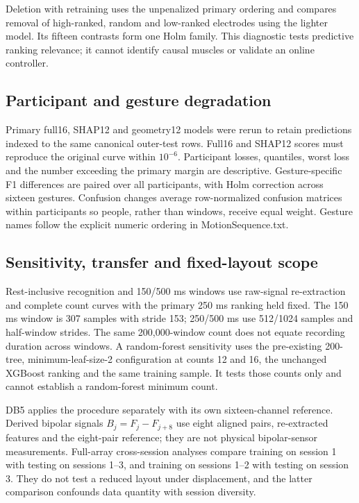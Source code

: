 Deletion with retraining uses the unpenalized primary ordering and compares removal of high-ranked, random and low-ranked electrodes using the lighter model. Its fifteen contrasts form one Holm family. This diagnostic tests predictive ranking relevance; it cannot identify causal muscles or validate an online controller.

\subsection{Participant and gesture degradation}
Primary full16, SHAP12 and geometry12 models were rerun to retain predictions indexed to the same canonical outer-test rows. Full16 and SHAP12 scores must reproduce the original curve within $10^{-6}$. Participant losses, quantiles, worst loss and the number exceeding the primary margin are descriptive. Gesture-specific F1 differences are paired over all participants, with Holm correction across sixteen gestures. Confusion changes average row-normalized confusion matrices within participants so people, rather than windows, receive equal weight. Gesture names follow the explicit numeric ordering in MotionSequence.txt.

\subsection{Sensitivity, transfer and fixed-layout scope}
Rest-inclusive recognition and 150/500 ms windows use raw-signal re-extraction and complete count curves with the primary 250 ms ranking held fixed. The 150 ms window is 307 samples with stride 153; 250/500 ms use 512/1024 samples and half-window strides. The same 200,000-window count does not equate recording duration across windows. A random-forest sensitivity uses the pre-existing 200-tree, minimum-leaf-size-2 configuration at counts 12 and 16, the unchanged XGBoost ranking and the same training sample. It tests those counts only and cannot establish a random-forest minimum count.

DB5 applies the procedure separately with its own sixteen-channel reference. Derived bipolar signals $B_j=F_j-F_{j+8}$ use eight aligned pairs, re-extracted features and the eight-pair reference; they are not physical bipolar-sensor measurements. Full-array cross-session analyses compare training on session 1 with testing on sessions 1--3, and training on sessions 1--2 with testing on session 3. They do not test a reduced layout under displacement, and the latter comparison confounds data quantity with session diversity.

